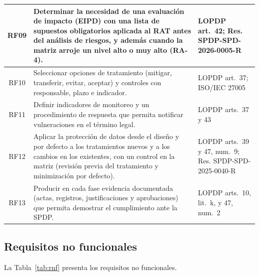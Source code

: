 \begin{table}[htbp]
\begin{tabularx}{\textwidth}{|c|L|p{3.6cm}|}
    \hline
    RF09 & Determinar la necesidad de una evaluación de impacto (EIPD) con una lista de supuestos obligatorios aplicada al RAT antes del análisis de riesgos, y además cuando la matriz arroje un nivel alto o muy alto (RA-4). & LOPDP art.~42; Res. SPDP-SPD-2026-0005-R \\
    \hline
    RF10 & Seleccionar opciones de tratamiento (mitigar, transferir, evitar, aceptar) y controles con responsable, plazo e indicador. & LOPDP art.~37; ISO/IEC 27005 \\
    \hline
    RF11 & Definir indicadores de monitoreo y un procedimiento de respuesta que permita notificar vulneraciones en el término legal. & LOPDP arts.~37 y 43 \\
    \hline
    RF12 & Aplicar la protección de datos desde el diseño y por defecto a los tratamientos nuevos y a los cambios en los existentes, con un control en la matriz (revisión previa del tratamiento y minimización por defecto). & LOPDP arts.~39 y 47, num.~9; Res. SPDP-SPD-2025-0040-R \\
    \hline
    RF13 & Producir en cada fase evidencia documentada (actas, registros, justificaciones y aprobaciones) que permita demostrar el cumplimiento ante la SPDP. & LOPDP arts.~10, lit.~k, y 47, num.~2 \\
    \hline
  \end{tabularx}
  \raggedright
\end{table}

\subsection{Requisitos no funcionales}

La Tabla~\ref{tab:rnf} presenta los requisitos no funcionales.

